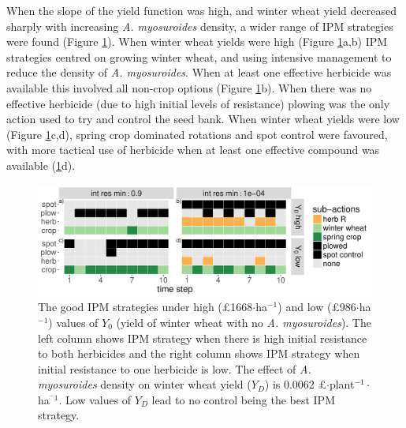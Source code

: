\documentclass[12pt, a4paper]{article}
\begin{document}
When the slope of the yield function was high, and winter wheat yield decreased sharply with increasing \textit{A. myosuroides} density, a wider range of IPM strategies were found (Figure \ref{fig:Y0_YD}). When winter wheat yields were high (Figure \ref{fig:Y0_YD}a,b) IPM strategies centred on growing winter wheat, and using intensive management to reduce the density of \textit{A. myosuroides}. When at least one effective herbicide was available this involved all non-crop options (Figure \ref{fig:Y0_YD}b). When there was no effective herbicide (due to high initial levels of resistance) plowing was the only action used to try and control the seed bank. When winter wheat yields were low (Figure \ref{fig:Y0_YD}c,d), spring crop dominated rotations and spot control were favoured, with more tactical use of herbicide when at least one effective compound was available (\ref{fig:Y0_YD}d).              
\begin{figure}[!ht]
	\includegraphics[width=120mm]{MS_figs/MS_act_seq_slope_Y0.pdf}
	\caption{The good IPM strategies under high (\pounds 1668$\cdot$ha$^{-1}$) and low (\pounds 986$\cdot$ha$^{-1}$) values of $Y_0$ (yield of winter wheat with no \textit{A. myosuroides}). The left column shows IPM strategy when there is high initial resistance to both herbicides and the right column shows IPM strategy when initial resistance to one herbicide is low. The effect of \textit{A. myosuroides} density on winter wheat yield ($Y_D$) is 0.0062 \pounds$\cdot$plant$^{-1}\cdot$ha$^{^-1}$. Low values of $Y_D$ lead to no control being the best IPM strategy.}
	\label{fig:Y0_YD} 
\end{figure}
\end{document}
